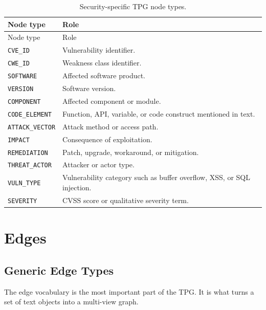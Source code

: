 \documentclass[11pt]{article}
\begin{document}
\begin{longtable}{lp{}}
\caption{Security-specific TPG node types.}\\
\toprule
Node type & Role \\
\midrule
\endfirsthead
\toprule
Node type & Role \\
\midrule
\endhead
\bottomrule
\endfoot
\texttt{CVE\_ID} & Vulnerability identifier. \\
\texttt{CWE\_ID} & Weakness class identifier. \\
\texttt{SOFTWARE} & Affected software product. \\
\texttt{VERSION} & Software version. \\
\texttt{COMPONENT} & Affected component or module. \\
\texttt{CODE\_ELEMENT} & Function, API, variable, or code construct mentioned in text. \\
\texttt{ATTACK\_VECTOR} & Attack method or access path. \\
\texttt{IMPACT} & Consequence of exploitation. \\
\texttt{REMEDIATION} & Patch, upgrade, workaround, or mitigation. \\
\texttt{THREAT\_ACTOR} & Attacker or actor type. \\
\texttt{VULN\_TYPE} & Vulnerability category such as buffer overflow, XSS, or SQL injection. \\
\texttt{SEVERITY} & CVSS score or qualitative severity term. \\
\end{longtable}

\section{Edges}

\subsection{Generic Edge Types}

The edge vocabulary is the most important part of the TPG. It is what turns a
set of text objects into a multi-view graph.
\end{document}
